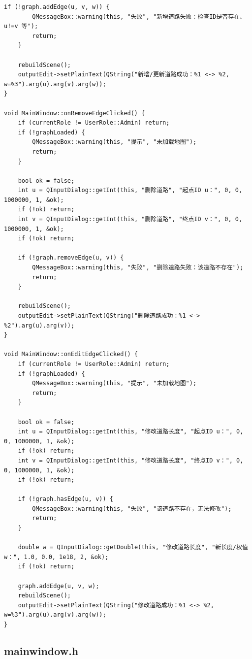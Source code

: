 \documentclass[UTF8,12pt,a4paper]{ctexart}
\begin{document}
\begin{lstlisting}[caption={mainwindow.cpp 源码}]
    if (!graph.addEdge(u, v, w)) {
        QMessageBox::warning(this, "失败", "新增道路失败：检查ID是否存在、u!=v 等");
        return;
    }

    rebuildScene();
    outputEdit->setPlainText(QString("新增/更新道路成功：%1 <-> %2, w=%3").arg(u).arg(v).arg(w));
}

void MainWindow::onRemoveEdgeClicked() {
    if (currentRole != UserRole::Admin) return;
    if (!graphLoaded) {
        QMessageBox::warning(this, "提示", "未加载地图");
        return;
    }

    bool ok = false;
    int u = QInputDialog::getInt(this, "删除道路", "起点ID u：", 0, 0, 1000000, 1, &ok);
    if (!ok) return;
    int v = QInputDialog::getInt(this, "删除道路", "终点ID v：", 0, 0, 1000000, 1, &ok);
    if (!ok) return;

    if (!graph.removeEdge(u, v)) {
        QMessageBox::warning(this, "失败", "删除道路失败：该道路不存在");
        return;
    }

    rebuildScene();
    outputEdit->setPlainText(QString("删除道路成功：%1 <-> %2").arg(u).arg(v));
}

void MainWindow::onEditEdgeClicked() {
    if (currentRole != UserRole::Admin) return;
    if (!graphLoaded) {
        QMessageBox::warning(this, "提示", "未加载地图");
        return;
    }

    bool ok = false;
    int u = QInputDialog::getInt(this, "修改道路长度", "起点ID u：", 0, 0, 1000000, 1, &ok);
    if (!ok) return;
    int v = QInputDialog::getInt(this, "修改道路长度", "终点ID v：", 0, 0, 1000000, 1, &ok);
    if (!ok) return;

    if (!graph.hasEdge(u, v)) {
        QMessageBox::warning(this, "失败", "该道路不存在，无法修改");
        return;
    }

    double w = QInputDialog::getDouble(this, "修改道路长度", "新长度/权值 w：", 1.0, 0.0, 1e18, 2, &ok);
    if (!ok) return;

    graph.addEdge(u, v, w);
    rebuildScene();
    outputEdit->setPlainText(QString("修改道路成功：%1 <-> %2, w=%3").arg(u).arg(v).arg(w));
}

\end{lstlisting}

\subsection{mainwindow.h}
\end{document}
